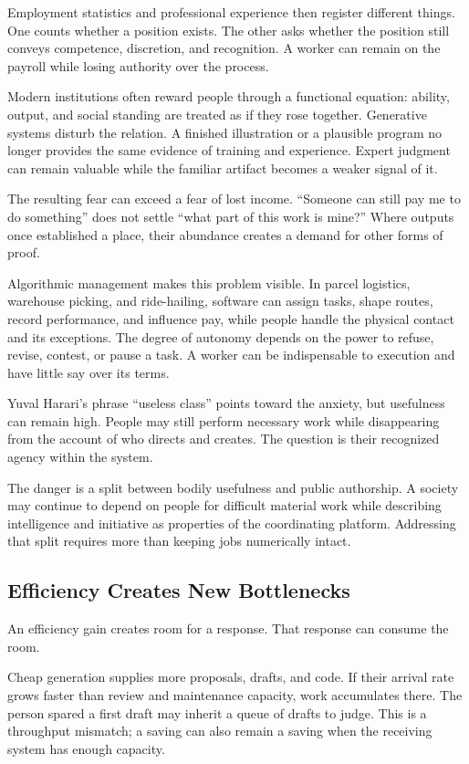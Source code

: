 \documentclass[11pt,openany]{book}
\begin{document}
Employment statistics and professional experience then register different things. One counts whether a position exists. The other asks whether the position still conveys competence, discretion, and recognition. A worker can remain on the payroll while losing authority over the process.

Modern institutions often reward people through a functional equation: ability, output, and social standing are treated as if they rose together. Generative systems disturb the relation. A finished illustration or a plausible program no longer provides the same evidence of training and experience. Expert judgment can remain valuable while the familiar artifact becomes a weaker signal of it.

The resulting fear can exceed a fear of lost income. “Someone can still pay me to do something” does not settle “what part of this work is mine?” Where outputs once established a place, their abundance creates a demand for other forms of proof.

Algorithmic management makes this problem visible. In parcel logistics, warehouse picking, and ride-hailing, software can assign tasks, shape routes, record performance, and influence pay, while people handle the physical contact and its exceptions. The degree of autonomy depends on the power to refuse, revise, contest, or pause a task. A worker can be indispensable to execution and have little say over its terms.

Yuval Harari's phrase “useless class” points toward the anxiety, but usefulness can remain high. People may still perform necessary work while disappearing from the account of who directs and creates. The question is their recognized agency within the system.

The danger is a split between bodily usefulness and public authorship. A society may continue to depend on people for difficult material work while describing intelligence and initiative as properties of the coordinating platform. Addressing that split requires more than keeping jobs numerically intact.

\subsection{Efficiency Creates New Bottlenecks}

An efficiency gain creates room for a response. That response can consume the room.

Cheap generation supplies more proposals, drafts, and code. If their arrival rate grows faster than review and maintenance capacity, work accumulates there. The person spared a first draft may inherit a queue of drafts to judge. This is a throughput mismatch; a saving can also remain a saving when the receiving system has enough capacity.
\end{document}
